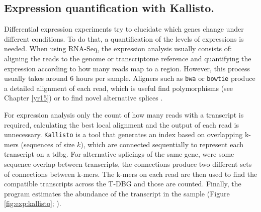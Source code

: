 \subsection{Expression quantification with Kallisto.}
\label{exp:kallisto}
Differential expression experiments try to elucidate which genes change under different conditions. 
To do that, a quantification of the levels of expressions is needed. 
When using RNA-Seq, the expression analysis usually consists of: aligning the reads to the genome or transcriptome reference and quantifying the expression according to how many reads map to a region. 
However, this process usually takes around 6 hours per sample. 
Aligners such as \texttt{bwa} or \texttt{bowtie} produce a detailed alignment of each read, which is useful find polymorphisms (see Chapter \ref{yr15}) or to find novel alternative splices \citep{Trapnell2012}. 

For expression analysis only the count of how many reads with a transcript is required, calculating the best local alignment and the output of each read is unnecessary. 
\verb|Kallisto| is a tool that generates an index based on overlapping k-mers (sequences of size $k$), which are connected sequentially to represent each transcript  on a \gls{tdbg}. 
For alternative splicings of the same gene, were some sequence overlap between transcripts, the connections produce two different sets of connections between k-mers. 
The k-mers on each read are then used to find the compatible transcripts across the T-DBG and those are counted. 
Finally, the program estimates the abundance of the transcript in the sample (Figure \ref{fig:exp:kallisto}; \citealt{Bray2016}).  


